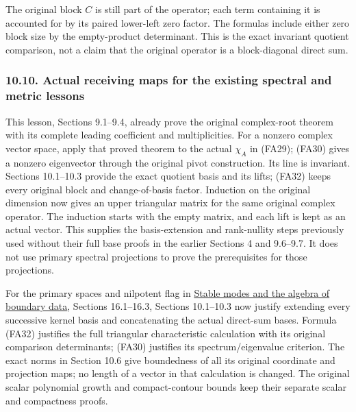 \documentclass[
  11pt,
]{article}
\begin{document}
The original block \(C\) is still part of the operator; each term
containing it is accounted for by its paired lower-left zero factor. The
formulas include either zero block size by the empty-product
determinant. This is the exact invariant quotient comparison, not a
claim that the original operator is a block-diagonal direct sum.

\subsubsection{10.10. Actual receiving maps for the existing spectral
and metric
lessons}\label{actual-receiving-maps-for-the-existing-spectral-and-metric-lessons}

This lesson, Sections 9.1--9.4, already prove the original complex-root
theorem with its complete leading coefficient and multiplicities. For a
nonzero complex vector space, apply that proved theorem to the actual
\(\chi_A\) in (FA29); (FA30) gives a nonzero eigenvector through the
original pivot construction. Its line is invariant. Sections 10.1--10.3
provide the exact quotient basis and its lifts; (FA32) keeps every
original block and change-of-basis factor. Induction on the original
dimension now gives an upper triangular matrix for the same original
complex operator. The induction starts with the empty matrix, and each
lift is kept as an actual vector. This supplies the basis-extension and
rank-nullity steps previously used without their full base proofs in the
earlier Sections 4 and 9.6--9.7. It does not use primary spectral
projections to prove the prerequisites for those projections.

For the primary spaces and nilpotent flag in
\href{stable-boundary-models.pdf}{Stable modes and the algebra of
boundary data}, Sections 16.1--16.3, Sections 10.1--10.3 now justify
extending every successive kernel basis and concatenating the actual
direct-sum bases. Formula (FA32) justifies the full triangular
characteristic calculation with its original comparison determinants;
(FA30) justifies its spectrum/eigenvalue criterion. The exact norms in
Section 10.6 give boundedness of all its original coordinate and
projection maps; no length of a vector in that calculation is changed.
The original scalar polynomial growth and compact-contour bounds keep
their separate scalar and compactness proofs.
\end{document}
